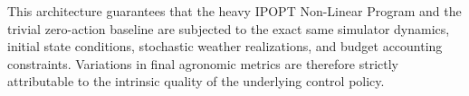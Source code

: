 \documentclass[11pt, a4paper]{article}
\begin{document}
This architecture guarantees that the heavy IPOPT Non-Linear Program and the trivial zero-action baseline are subjected to the exact same simulator dynamics, initial state conditions, stochastic weather realizations, and budget accounting constraints. Variations in final agronomic metrics are therefore strictly attributable to the intrinsic quality of the underlying control policy.
\end{document}
